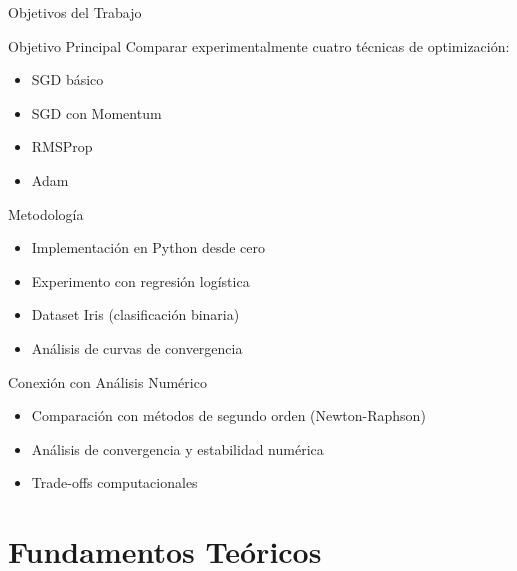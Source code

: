 \documentclass[10pt]{beamer}
\begin{document}
\begin{frame}{Objetivos del Trabajo}
\begin{block}{Objetivo Principal}
Comparar experimentalmente cuatro técnicas de optimización:
\begin{itemize}
\item SGD básico
\item SGD con Momentum  
\item RMSProp
\item Adam
\end{itemize}
\end{block}

\begin{block}{Metodología}
\begin{itemize}
\item Implementación en Python desde cero
\item Experimento con regresión logística
\item Dataset Iris (clasificación binaria)
\item Análisis de curvas de convergencia
\end{itemize}
\end{block}

\begin{block}{Conexión con Análisis Numérico}
\begin{itemize}
\item Comparación con métodos de segundo orden (Newton-Raphson)
\item Análisis de convergencia y estabilidad numérica
\item Trade-offs computacionales
\end{itemize}
\end{block}
\end{frame}

\section{Fundamentos Teóricos}
\end{document}
